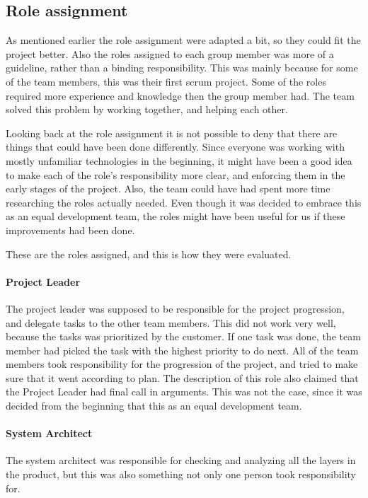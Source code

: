 \subsection{Role assignment}
As mentioned earlier the role assignment were adapted a bit, so they could fit the project better. Also the roles assigned to each group member was more of a guideline, rather than a binding responsibility. This was mainly because for some of the team members, this was their first scrum project. Some of the roles required more experience and knowledge then the group member had. The team solved this problem by working together, and helping each other. 

Looking back at the role assignment it is not possible to deny that there are things that could have been done differently. Since everyone was working with mostly unfamiliar technologies in the beginning, it might have been a good idea to make each of the role's responsibility more clear, and enforcing them in the early stages of the project. Also, the team could have had spent more time researching the roles actually needed. Even though it was decided to embrace this as an equal development team, the roles might have been useful for us if these improvements had been done. 

These are the roles assigned, and this is how they were evaluated.

\paragraph{Project Leader}
The project leader was supposed to be responsible for the project progression, and delegate tasks to the other team members. This did not work very well, because the tasks was prioritized by the customer. If one task was done, the team member had picked the task with the highest priority to do next. All of the team members took responsibility for the progression of the project, and tried to make sure that it went according to plan. The description of this role also claimed that the Project Leader had final call in arguments. This was not the case, since it was decided from the beginning that this as an equal development team.

\paragraph{System Architect}
The system architect was responsible for checking and analyzing all the layers in the product, but this was also something not only one person took responsibility for. 

